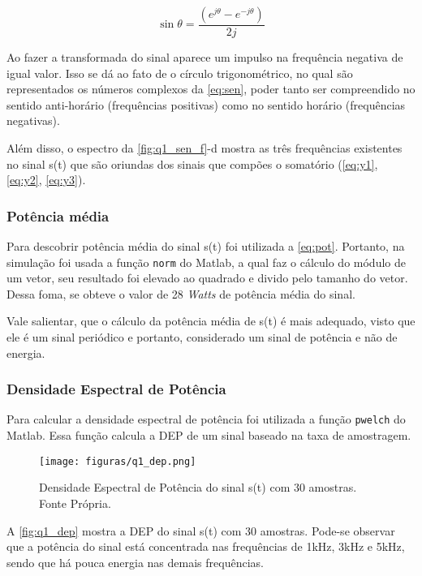 \documentclass[11pt]{classes/ifscarticle}
\begin{document}
 \begin{equation}
     \sin \theta = \frac{(e^{j\theta} - e^{-j\theta})}{2j}
     \label{eq:sen}
 \end{equation}

Ao fazer a transformada do sinal aparece um impulso na frequência negativa de igual valor. Isso se dá ao fato de o círculo trigonométrico, no qual são representados os números complexos da \autoref{eq:sen}, poder tanto ser compreendido no sentido anti-horário (frequências positivas) como no sentido horário (frequências negativas).

Além disso, o espectro da \autoref{fig:q1_sen_f}-d mostra as três frequências existentes no sinal s(t) que são oriundas dos sinais que compões o somatório (\autoref{eq:y1}, \autoref{eq:y2}, \autoref{eq:y3}).

\newpage
\subsubsection{Potência média}

Para descobrir potência média do sinal s(t) foi utilizada a \autoref{eq:pot}. Portanto, na simulação foi usada a função \texttt{norm} do Matlab, a qual faz o cálculo do módulo de um vetor, seu resultado foi elevado ao quadrado e divido pelo tamanho do vetor. Dessa foma, se obteve o valor de 28 \textit{Watts} de potência média do sinal.

Vale salientar, que o cálculo da potência média de s(t) é mais adequado, visto que ele é um sinal periódico e portanto, considerado um sinal de potência e não de energia.

\subsubsection{Densidade Espectral de Potência}

Para calcular a densidade espectral de potência foi utilizada a função \texttt{pwelch} do Matlab. Essa função calcula a DEP de um sinal baseado na taxa de amostragem.

\begin{figure}[ht]
    \centering
    \texttt{[image: figuras/q1\_dep.png]}
    \caption{Densidade Espectral de Potência do sinal s(t) com 30 amostras. Fonte Própria.}
    \label{fig:q1_dep}
\end{figure}

A \autoref{fig:q1_dep} mostra a DEP do sinal s(t) com 30 amostras. Pode-se observar que a potência do sinal está concentrada nas frequências de 1kHz, 3kHz e 5kHz, sendo que há pouca energia nas demais frequências. 
\end{document}
